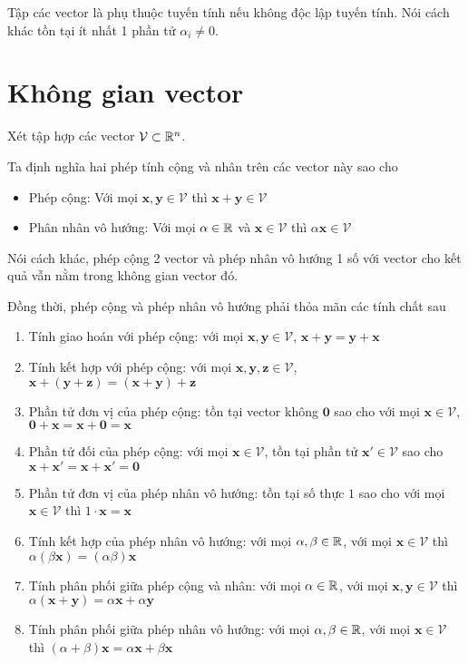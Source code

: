 \begin{definition}
    Tập các vector là phụ thuộc tuyến tính nếu không độc lập tuyến tính.
    Nói cách khác tồn tại ít nhất 1 phần tử $\alpha_i \neq 0$.
\end{definition}

\section{Không gian vector}

Xét tập hợp các vector $\mathcal{V} \subset \mathbb{R}^n$.

Ta định nghĩa hai phép tính cộng và nhân trên các vector này sao cho

\begin{itemize}[noitemsep]
    \item Phép cộng: Với mọi $\bm{x}, \bm{y} \in \mathcal{V}$ thì $\bm{x} + \bm{y} \in \mathcal{V}$
    \item Phân nhân vô hướng: Với mọi $\alpha \in \mathbb{R}$ và $\bm{x} \in \mathcal{V}$ thì $\alpha \bm{x} \in \mathcal{V}$
\end{itemize}

Nói cách khác, phép cộng 2 vector và phép nhân vô hướng 1 số với vector cho kết quả vẫn nằm trong không gian vector đó.

Đồng thời, phép cộng và phép nhân vô hướng phải thỏa mãn các tính chất sau

\begin{enumerate}[noitemsep]
    \item Tính giao hoán với phép cộng: với mọi $\bm{x}, \bm{y} \in \mathcal{V}$, $\bm{x} + \bm{y} = \bm{y} + \bm{x}$
    \item Tính kết hợp với phép cộng: với mọi $\bm{x}, \bm{y}, \bm{z} \in \mathcal{V}$, $\bm{x} + (\bm{y} + \bm{z}) = (\bm{x} + \bm{y}) + \bm{z}$
    \item Phần tử đơn vị của phép cộng: tồn tại vector không $\bm{0}$ sao cho với mọi $\bm{x} \in \mathcal{V}$, $\bm{0} + \bm{x} = \bm{x} + \bm{0} = \bm{x}$
    \item Phần tử đối của phép cộng: với mọi $\bm{x} \in \mathcal{V}$, tồn tại phần tử $\bm{x'} \in \mathcal{V}$ sao cho $\bm{x} + \bm{x'} = \bm{x} + \bm{x'} = \bm{0}$
    \item Phần tử đơn vị của phép nhân vô hướng: tồn tại số thực $1$ sao cho với mọi $\bm{x} \in \mathcal{V}$ thì $1 \cdot \bm{x} = \bm{x}$
    \item Tính kết hợp của phép nhân vô hướng: với mọi $\alpha, \beta \in \mathbb{R}$, với mọi $\bm{x} \in \mathcal{V}$ thì $\alpha (\beta \bm{x}) = (\alpha \beta) \bm{x}$
    \item Tính phân phối giữa phép cộng và nhân: với mọi $\alpha \in \mathbb{R}$, với mọi $\bm{x}, \bm{y} \in \mathcal{V}$ thì $\alpha (\bm{x} + \bm{y}) = \alpha \bm{x} + \alpha \bm{y}$
    \item Tính phân phối giữa phép nhân vô hướng: với mọi $\alpha, \beta \in \mathbb{R}$, với mọi $\bm{x} \in \mathcal{V}$ thì $(\alpha + \beta) \bm{x} = \alpha \bm{x} + \beta \bm{x}$
\end{enumerate}


